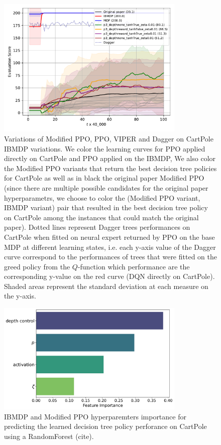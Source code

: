 \begin{figure}
    \centering
    \includegraphics[width=0.8\textwidth]{images/images_part1/ppo.pdf}
    \caption{Variations of Modified PPO, PPO, VIPER and Dagger on CartPole IBMDP variations. We color the learning curves for PPO applied directly on CartPole and PPO applied on the IBMDP,
    We also color the Modified PPO variants that return the best decision tree policies for CartPole as well as in black the original paper Modified PPO (since there are multiple possible candidates for the original paper hyperparametrs, we choose to color the (Modified PPO variant, IBMDP variant) pair that resulted in the best decision tree policy on CartPole among the instances that could match the original paper).
    Dotted lines represent Dagger trees performances on CartPole when fitted on neural expert returned by PPO on the base MDP at different learning states, i.e. each y-axis value of the Dagger curve correspond to the performances of trees that were fitted on the greed policy from the $Q$-function which performance are the corresponding y-value on the red curve (DQN directly on CartPole).
    Shaded areas represent the standard deviation at each measure on the y-axis.}
\end{figure}

\begin{figure}
    \centering
    \includegraphics[width=0.8\textwidth]{images/images_part1/hyperparameter_importance_ppo.pdf}
    \caption{IBMDP and Modified PPO hyperparemters importance for predicting the learned decision tree policy perforance on CartPole using a RandomForest (cite).}
\end{figure}

